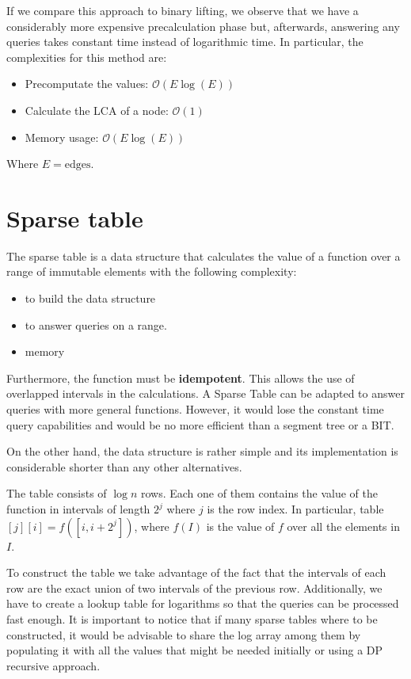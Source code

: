 If we compare this approach to binary lifting, we observe that we have a considerably
more expensive precalculation phase but, afterwards, answering any queries takes
constant time instead of logarithmic time. In particular, the complexities for this 
method are:
\begin{itemize}
		\setlength{\itemsep}{1pt}
		\item Precomputate the values: $\mathcal{O}(E\log(E))$
		\item Calculate the LCA of a node: $\mathcal{O}(1)$
		\item Memory usage: $\mathcal{O}(E\log(E))$
\end{itemize}
Where $E=\text{edges}$.

\newpage


\section{Sparse table}
The sparse table is a data structure that calculates the value of 
a function over a range of immutable elements with the following complexity:
\begin{itemize}
		\setlength{\itemsep}{2 pt}
		\item {} to build the data structure
		\item {} to answer queries on a range. 
		\item {} memory
\end{itemize}
Furthermore, the function must be \textbf{idempotent}. This allows the use of
overlapped intervals in the calculations. A Sparse Table can be adapted to 
answer queries with more general functions. However, it would lose the constant
time query capabilities and would be no more efficient than a segment tree or a BIT.


On the other hand, the data structure is rather simple and its implementation 
is considerable shorter than any other alternatives. 

The table consists of $\log n$ rows. Each one of them contains the value of the
function in intervals of length $2^j$ where $j$ is the row index. In particular,
table$[j][i]=f([i,i+2^j])$, where $f(I)$ is the value of $f$ over all the 
elements in $I$.

To construct the table we take advantage of the fact that the intervals of each
row are the exact union of two intervals of the previous row. Additionally, we 
have to create a lookup table for logarithms so that the queries can be 
processed fast enough.
It is important to notice that if many sparse tables where to be constructed,
it would be advisable to share the log array among them by populating it with
all the values that might be needed initially or using a DP recursive approach.

